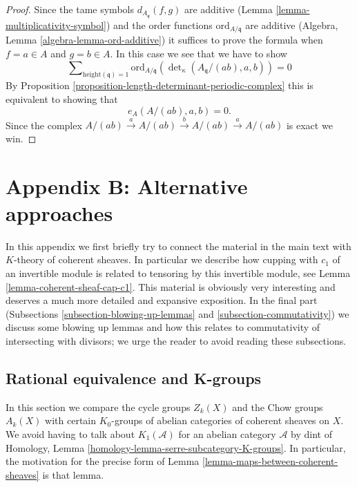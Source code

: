 \begin{proof}
Since the tame symbols $d_{A_{\mathfrak q}}(f, g)$ are additive
(Lemma \ref{lemma-multiplicativity-symbol}) and the order
functions $\text{ord}_{A/\mathfrak q}$
are additive (Algebra, Lemma \ref{algebra-lemma-ord-additive})
it suffices to prove the formula when $f = a \in A$ and
$g = b \in A$. In this case we see that we have to show
$$
\sum\nolimits_{\text{height}(\mathfrak q) = 1}
\text{ord}_{A/\mathfrak q}(\det\nolimits_\kappa(A_{\mathfrak q}/(ab), a, b))
= 0
$$
By Proposition \ref{proposition-length-determinant-periodic-complex}
this is equivalent to showing that
$$
e_A(A/(ab), a, b) = 0.
$$
Since the complex
$A/(ab) \xrightarrow{a} A/(ab) \xrightarrow{b} A/(ab) \xrightarrow{a} A/(ab)$
is exact we win.
\end{proof}





\section{Appendix B: Alternative approaches}
\label{section-appendix-chow}

\noindent
In this appendix we first briefly try to connect the material
in the main text with $K$-theory of coherent sheaves. In
particular we describe how cupping with $c_1$ of an invertible
module is related to tensoring by this invertible module, see
Lemma \ref{lemma-coherent-sheaf-cap-c1}.
This material is obviously very interesting and
deserves a much more detailed and expansive exposition.
In the final part (Subsections
\ref{subsection-blowing-up-lemmas} and
\ref{subsection-commutativity})
we discuss some blowing up lemmas and how this relates
to commutativity of intersecting with divisors; we urge
the reader to avoid reading these subsections.


\subsection{Rational equivalence and K-groups}
\label{subsection-rational-equivalence-K-groups}

\noindent
In this section we compare the cycle groups $Z_k(X)$ and
the Chow groups $A_k(X)$ with certain $K_0$-groups of
abelian categories of coherent sheaves on $X$. We avoid having
to talk about $K_1(\mathcal{A})$ for an abelian category
$\mathcal{A}$ by dint of
Homology, Lemma \ref{homology-lemma-serre-subcategory-K-groups}.
In particular, the motivation for the precise form of
Lemma \ref{lemma-maps-between-coherent-sheaves} is that lemma.

